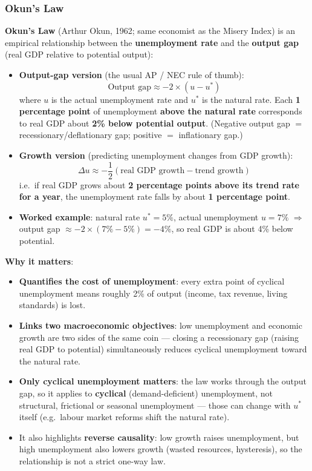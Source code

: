 \documentclass[a4paper,12pt]{article}
\newcommand{\needbold}[1]{\textcolor{red!70!black}{\textbf{#1}}}
\begin{document}
\subsubsection*{Okun's Law}
\needbold{Okun's Law} (Arthur Okun, 1962; same economist as the Misery Index) is an empirical relationship between the \textbf{unemployment rate} and the \textbf{output gap} (real GDP relative to potential output):
\begin{itemize}
  \item \textbf{Output-gap version} (the usual AP / NEC rule of thumb):
  \[\text{Output gap} \approx -2 \times (u - u^*)\]
  where $u$ is the actual unemployment rate and $u^*$ is the natural rate. Each \textbf{1 percentage point} of unemployment \textbf{above the natural rate} corresponds to real GDP about \textbf{2\% below potential output}. (Negative output gap $=$ recessionary/deflationary gap; positive $=$ inflationary gap.)
  \item \textbf{Growth version} (predicting unemployment changes from GDP growth):
  \[\Delta u \approx -\dfrac{1}{2}\left(\text{real GDP growth} - \text{trend growth}\right)\]
  i.e.\ if real GDP grows about \textbf{2 percentage points above its trend rate for a year}, the unemployment rate falls by about \textbf{1 percentage point}.
  \item \textbf{Worked example}: natural rate $u^* = 5\%$, actual unemployment $u = 7\%$ $\Rightarrow$ output gap $\approx -2 \times (7\% - 5\%) = -4\%$, so real GDP is about 4\% below potential.
\end{itemize}
\textbf{Why it matters}:
\begin{itemize}
  \item \textbf{Quantifies the cost of unemployment}: every extra point of cyclical unemployment means roughly 2\% of output (income, tax revenue, living standards) is lost.
  \item \textbf{Links two macroeconomic objectives}: low unemployment and economic growth are two sides of the same coin --- closing a recessionary gap (raising real GDP to potential) simultaneously reduces cyclical unemployment toward the natural rate.
  \item \textbf{Only cyclical unemployment matters}: the law works through the output gap, so it applies to \textbf{cyclical} (demand-deficient) unemployment, not structural, frictional or seasonal unemployment --- those can change with $u^*$ itself (e.g.\ labour market reforms shift the natural rate).
  \item It also highlights \textbf{reverse causality}: low growth raises unemployment, but high unemployment also lowers growth (wasted resources, hysteresis), so the relationship is not a strict one-way law.
\end{itemize}
\end{document}

